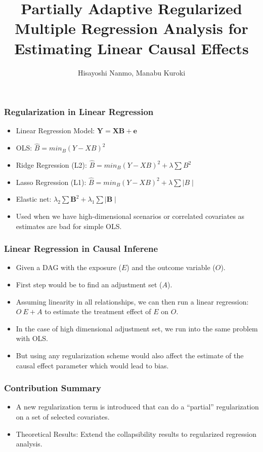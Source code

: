 \documentclass{beamer}
\title{Partially Adaptive Regularized Multiple Regression Analysis for Estimating Linear Causal Effects}
\author{Hisayoshi Nanmo, Manabu Kuroki}
\date{}
\begin{document}
\maketitle

\begin{frame}
	\frametitle{Regularization in Linear Regression}
	\begin{itemize}
		\item Linear Regression Model: $ \bm{Y} = \bm{XB} + \bm{e} $
		\item OLS: $ \hat{B} = min_{B} (Y - XB)^2 $
		\item Ridge Regression (L2): $ \hat{B} = min_{B} (Y-XB)^2 +
			\lambda \sum B^2 $
		\item Lasso Regression (L1): $ \hat{B} = min_{B} (Y-XB)^2 +
			\lambda \sum \mid B \mid $
		\item Elastic net: $ \lambda_2 \sum \bm{B}^2 + \lambda_1 \sum
			\mid \bm{B} \mid $
		\item Used when we have high-dimensional scenarios or
			correlated covariates as estimates are bad for simple
			OLS.
	\end{itemize}
\end{frame}

\begin{frame}
	\frametitle{Linear Regression in Causal Inferene}
	\begin{itemize}
		\item Given a DAG with the exposure ($ E $) and the outcome
			variable ($ O $).
		\item First step would be to find an adjustment set ($ A $).
		\item Assuming linearity in all relationships, we can then run
			a linear regression: $ O ~ E + A $ to estimate the
			treatment effect of $ E $ on $ O $.
		\item In the case of high dimensional adjustment set, we run
			into the same problem with OLS.
		\item But using any regularization scheme would also affect the
			estimate of the causal effect parameter which would
			lead to bias.
	\end{itemize}
\end{frame}

\begin{frame}
	\frametitle{Contribution Summary}
	\begin{itemize}
		\item A new regularization term is introduced that can do a
			``partial'' regularization on a set of selected
			covariates.
		\item Theoretical Results: Extend the collapsibility results to
			regularized regression analysis.
	\end{itemize}
\end{frame}
\end{document}
